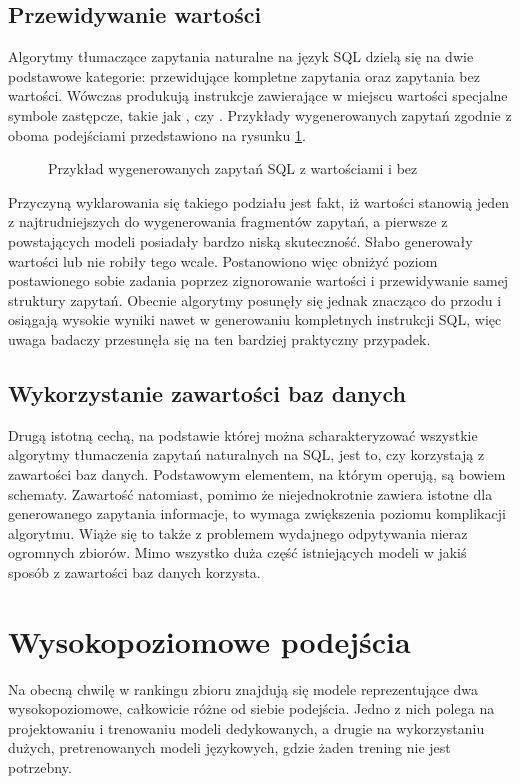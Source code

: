 \subsection{Przewidywanie wartości}
Algorytmy tłumaczące zapytania naturalne na język SQL dzielą się na dwie podstawowe kategorie: przewidujące kompletne zapytania oraz zapytania bez wartości. Wówczas produkują instrukcje zawierające w miejscu wartości specjalne symbole zastępcze, takie jak , czy . Przykłady wygenerowanych zapytań zgodnie z oboma podejściami przedstawiono na rysunku \ref{fig:query-values}.

\begin{figure}[ht!]
  \centering
  
  \caption{Przykład wygenerowanych zapytań SQL z wartościami i bez}
  \label{fig:query-values}
\end{figure}

Przyczyną wyklarowania się takiego podziału jest fakt, iż wartości stanowią jeden z najtrudniejszych do wygenerowania fragmentów zapytań, a pierwsze z powstających modeli posiadały bardzo niską skuteczność. Słabo generowały wartości lub nie robiły tego wcale. Postanowiono więc obniżyć poziom postawionego sobie zadania poprzez zignorowanie wartości i przewidywanie samej struktury zapytań. Obecnie algorytmy posunęły się jednak znacząco do przodu i osiągają wysokie wyniki nawet w generowaniu kompletnych instrukcji SQL, więc uwaga badaczy przesunęła się na ten bardziej praktyczny przypadek.

\subsection{Wykorzystanie zawartości baz danych}
Drugą istotną cechą, na podstawie której można scharakteryzować wszystkie algorytmy tłumaczenia zapytań naturalnych na SQL, jest to, czy korzystają z zawartości baz danych. Podstawowym elementem, na którym operują, są bowiem schematy. Zawartość natomiast, pomimo że niejednokrotnie zawiera istotne dla generowanego zapytania informacje, to wymaga zwiększenia poziomu komplikacji algorytmu. Wiąże się to także z problemem wydajnego odpytywania nieraz ogromnych zbiorów. Mimo wszystko duża część istniejących modeli w jakiś sposób z zawartości baz danych korzysta.

\section{Wysokopoziomowe podejścia}
Na obecną chwilę w rankingu zbioru  znajdują się modele reprezentujące dwa wysokopoziomowe, całkowicie różne od siebie podejścia. Jedno z nich polega na projektowaniu i trenowaniu modeli dedykowanych, a drugie na wykorzystaniu dużych, pretrenowanych modeli językowych, gdzie żaden trening nie jest potrzebny. 

